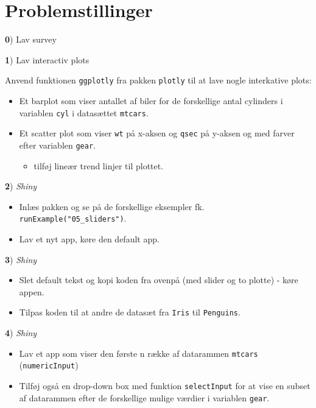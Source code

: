 \documentclass[
]{book}
\providecommand{\tightlist}{%
  \setlength{\itemsep}{0pt}\setlength{\parskip}{0pt}}
\begin{document}
\hypertarget{problemstillinger-10}{%
\section{Problemstillinger}\label{problemstillinger-10}}

\textbf{0}) Lav survey

\textbf{1}) Lav interactiv plots

Anvend funktionen \texttt{ggplotly} fra pakken \texttt{plotly} til at lave nogle interkative plots:

\begin{itemize}
\tightlist
\item
  Et barplot som viser antallet af biler for de forskellige antal cylinders i variablen \texttt{cyl} i datasættet \texttt{mtcars}.
\item
  Et scatter plot som viser \texttt{wt} på x-aksen og \texttt{qsec} på y-aksen og med farver efter variablen \texttt{gear}.

  \begin{itemize}
  \tightlist
  \item
    tilføj lineær trend linjer til plottet.
  \end{itemize}
\end{itemize}

\textbf{2}) \emph{Shiny}

\begin{itemize}
\tightlist
\item
  Inlæs pakken og se på de forskellige eksempler fk. \texttt{runExample("05\_sliders")}.
\item
  Lav et nyt app, køre den default app.
\end{itemize}

\textbf{3}) \emph{Shiny}

\begin{itemize}
\tightlist
\item
  Slet default tekst og kopi koden fra ovenpå (med slider og to plotte) - køre appen.
\item
  Tilpas koden til at andre de datasæt fra \texttt{Iris} til \texttt{Penguins}.
\end{itemize}

\textbf{4}) \emph{Shiny}

\begin{itemize}
\tightlist
\item
  Lav et app som viser den første n række af datarammen \texttt{mtcars} (\texttt{numericInput})
\item
  Tilføj også en drop-down box med funktion \texttt{selectInput} for at vise en subset af datarammen efter de forskellige mulige værdier i variablen \texttt{gear}.
\end{itemize}
\end{document}
